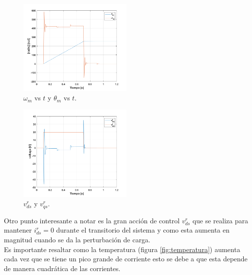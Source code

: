 \documentclass[10pt]{article}
\begin{document}
\begin{itemize}
	\begin{figure}[h!]
	\centering
	\includegraphics[width=0.5\textwidth]{theta_m.png}
	\caption{\label{fig:theta_m} $\omega_{m}$ vs $t$ y $\theta_{m}$ vs $t$.}
	\end{figure}
	\begin{figure}[h!]
	\centering
	\includegraphics[width=0.5\textwidth]{vd_vq.png}
	\caption{\label{fig:vd_vq} $v^{r}_{ds}$ y $v^{r}_{qs}$.}
	\end{figure}
	Otro punto interesante a notar es la gran acción de control $v^{r}_{ds}$ que se realiza para mantener $i^{r}_{ds}=0$ durante el transitorio del sistema y como esta aumenta en magnitud cuando se da la perturbación de carga.\\
	Es importante resaltar como la temperatura (figura \ref{fig:temperatura}) aumenta cada vez que se tiene un pico grande de corriente esto se debe a que esta depende de manera cuadrática de las corrientes.\\


\end{itemize}
\end{document}
